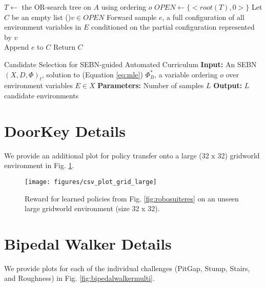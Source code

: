 \begin{algorithm}
\SetAlgoLined
$T\gets$ the OR-search tree on $A$ using ordering $o$\;
$OPEN\gets \{<root(T), 0>\}$ 
Let $C$ be an empty list
\For(){$v \in OPEN$}{
	Forward sample $e$, a full configuration of all environment variables in $E$ conditioned on the partial configuration represented by $v$\\
	Append $e$ to $C$
}
Return $C$
 \caption{Candidate Selection for SEBN-guided Automated Curriculum\newline
 \textbf{Input:} An SEBN $(X,D,\Phi)_t$, solution to (Equation \ref{eq:mle}) $\Phi_B^*$, a variable ordering $o$ over environment variables $E \in X$ \newline
 \textbf{Parameters:} Number of samples $L$ \newline
 \textbf{Output:} $L$ candidate environments }
 \label{alg:candidate_select}
\end{algorithm}

\section{DoorKey Details}
We provide an additional plot for policy transfer onto a large (32 x 32) gridworld environment in Fig. \ref{fig:doorkeylarge}. 

\begin{figure}
    \texttt{[image: figures/csv\_plot\_grid\_large]}
    \caption{Reward for learned policies from Fig. \ref{fig:robosuiteres} on an unseen large gridworld environment (size 32 x 32). 
    }
    \label{fig:doorkeylarge}
\end{figure}

\section{Bipedal Walker Details}
We provide plots for each of the individual challenges (PitGap, Stump, Stairs, and Roughness) in Fig. \ref{fig:bipedalwalkermulti}. 

